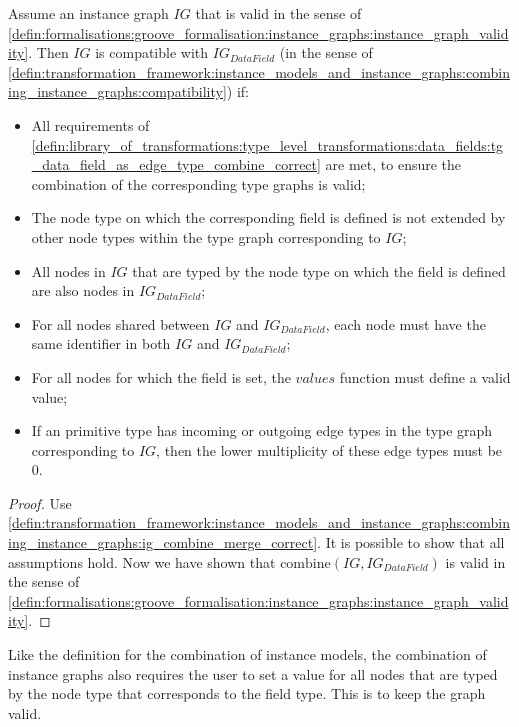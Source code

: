 \begin{thm}
\label{defin:library_of_transformations:instance_level_transformations:data_field_values:ig_data_field_as_edge_type_combine_correct}
Assume an instance graph $IG$ that is valid in the sense of \cref{defin:formalisations:groove_formalisation:instance_graphs:instance_graph_validity}. Then $IG$ is compatible with $IG_{DataField}$ (in the sense of \cref{defin:transformation_framework:instance_models_and_instance_graphs:combining_instance_graphs:compatibility}) if:
\begin{itemize}
    \item All requirements of \cref{defin:library_of_transformations:type_level_transformations:data_fields:tg_data_field_as_edge_type_combine_correct} are met, to ensure the combination of the corresponding type graphs is valid;
    \item The node type on which the corresponding field is defined is not extended by other node types within the type graph corresponding to $IG$;
    \item All nodes in $IG$ that are typed by the node type on which the field is defined are also nodes in $IG_{DataField}$;
    \item For all nodes shared between $IG$ and $IG_{DataField}$, each node must have the same identifier in both $IG$ and $IG_{DataField}$;
    \item For all nodes for which the field is set, the $values$ function must define a valid value;
    \item If an primitive type has incoming or outgoing edge types in the type graph corresponding to $IG$, then the lower multiplicity of these edge types must be 0.
\end{itemize}
\end{thm}

\begin{proof}
Use \cref{defin:transformation_framework:instance_models_and_instance_graphs:combining_instance_graphs:ig_combine_merge_correct}. It is possible to show that all assumptions hold. Now we have shown that $\mathrm{combine}(IG, IG_{DataField})$ is valid in the sense of \cref{defin:formalisations:groove_formalisation:instance_graphs:instance_graph_validity}.
\end{proof}

Like the definition for the combination of instance models, the combination of instance graphs also requires the user to set a value for all nodes that are typed by the node type that corresponds to the field type. This is to keep the graph valid.

